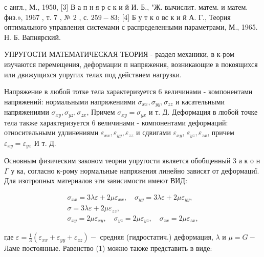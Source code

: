 \documentclass[10pt]{article}
\begin{document}
с англ., М., 1950, [3] В а п н я р с к и й И. Б., "Ж. вычислит. матем. и матем. физ.», 1967 , т. 7 , № 2 , с. $259-83$; [4] Б у т к о вс к и й А. Г., Теория оптимального управления системами с распределенными параметрами, М., 1965. Н. Б. Вапнярский.



УПРУГОСТИ МАТЕМАТИЧЕСКАЯ ТЕОРИЯ - раздел механики, в к-ром изучаются перемещения, деформации п напряжения, возникающие в покоящихся или движущихся упругих телах под действием нагрузки.



Напряжение в любой тотке тела характеризуется 6 величинами - компонентами напряжений: нормальными напряжениями $\sigma_{x x}, \sigma_{y y}, \sigma_{z z}$ и касательными напряжениями $\sigma_{x y}, \sigma_{y z}, \sigma_{z x}$, Причем $\sigma_{x y}=\sigma_{y x}$ и т. Д. Деформация в любой точке тела также характеризуется 6 величинами - компонентами деформаций: относительными удлинениями $\varepsilon_{x x}, \varepsilon_{y y}, \varepsilon_{z z}$ и сдвигами $\varepsilon_{x y}$, $\varepsilon_{y z}, \varepsilon_{z x}$, причем $\varepsilon_{x y}=\varepsilon_{y x}$ И т. Д.



Основным физическим законом теории упругости является обобщенный 3 а к о н $\Gamma$ у ка, согласно к-рому нормальные напряжения линейно зависят от деформациї. Для изотропных материалов эти зависимости имеют ВИД:



\[

\begin{gathered}

\sigma_{x x}=3 \lambda \varepsilon+2 \mu \varepsilon_{x x}, \quad \sigma_{y y}=3 \lambda \varepsilon+2 \mu \varepsilon_{y y}, \\

\sigma=3 \lambda \varepsilon+2 \mu \varepsilon_{z z}, \\

\sigma_{x y}=2 \mu \varepsilon_{x y}, \quad \sigma_{y z}=2 \mu \varepsilon_{y z}, \quad \sigma_{z x}=2 \mu \varepsilon_{z x},

\end{gathered}

\]



где $\varepsilon=\frac{1}{3}\left(\varepsilon_{x x}+\varepsilon_{y y}+\varepsilon_{z z}\right)-$ средняя (гидростатич.) деформация, $\lambda$ и $\mu=G-$ Ламе постоянные. Равенство (1) можно также представить в виде:
\end{document}

